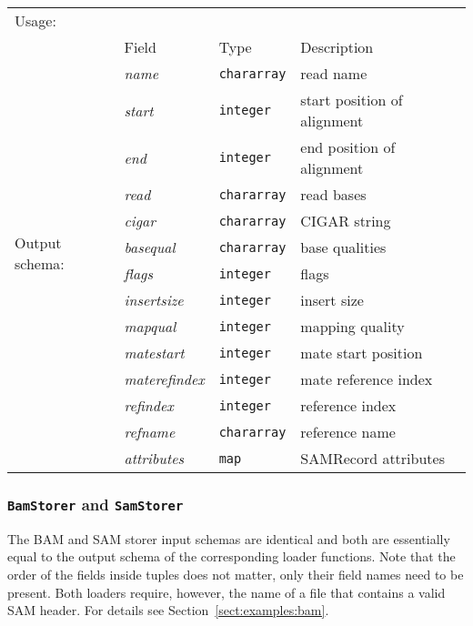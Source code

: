 \begin{tabular}{lp{}p{}p{}}
Usage: & \multicolumn{3}{l}{}
\hspace*{-0.55cm}\begin{minipage}{0.7\textwidth}
  \begin{lstlisting}
  reads = load 'input.bam' using BamLoader('yes');
  \end{lstlisting}
  \end{minipage}\hfill\kern-\arrayrulewidth
 \\[0.25cm]
\multirow{15}{*}{Output schema:} & Field & Type & Description\\[0.1cm]
& \emph{name} & \texttt{chararray} & read name\\
& \emph{start} & \texttt{integer} & start position of alignment\\
& \emph{end} & \texttt{integer} & end position of alignment\\
& \emph{read} & \texttt{chararray} & read bases\\
& \emph{cigar} & \texttt{chararray} & CIGAR string\\
& \emph{basequal} & \texttt{chararray} & base qualities\\
& \emph{flags} & \texttt{integer} & flags\\
& \emph{insertsize} & \texttt{integer} & insert size\\
& \emph{mapqual} & \texttt{integer} & mapping quality\\
& \emph{matestart} & \texttt{integer} & mate start position\\
& \emph{materefindex} & \texttt{integer} & mate reference index\\
& \emph{refindex} & \texttt{integer} & reference index\\
& \emph{refname}  & \texttt{chararray} & reference name\\
& \emph{attributes} & \texttt{map} & SAMRecord attributes
\end{tabular}

\subsubsection{\texttt{BamStorer} and \texttt{SamStorer}}

The BAM and SAM storer input schemas are identical and both are
essentially equal to the output schema of the corresponding loader
functions. Note that the order of the fields inside tuples does not
matter, only their field names need to be present. Both loaders
require, however, the name of a file that contains a valid SAM header.
For details see Section~\ref{sect:examples:bam}.

